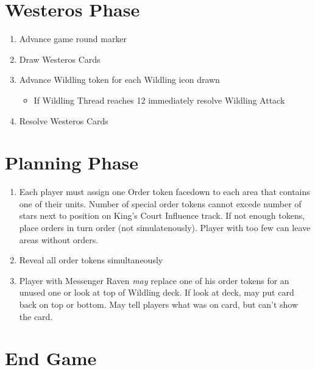 \documentclass[12pt]{article}
\newenvironment{enumerateCustom}
{\begin{enumerate}
  \setlength{\itemsep}{1pt}
  \setlength{\parskip}{0pt}
  \setlength{\parsep}{0pt}}
{\end{enumerate}}
\newenvironment{itemizeCustom}
{\begin{itemize}
  \setlength{\itemsep}{1pt}
  \setlength{\parskip}{0pt}
  \setlength{\parsep}{0pt}}
{\end{itemize}}
\begin{document}
\begin{mdframed}[style = customFrame]
\begin{multicols*}{2}
\section*{Westeros Phase}
\begin{enumerateCustom}
	\item Advance game round marker
	\item Draw Westeros Cards
	\item Advance Wildling token for each Wildling icon drawn 
	\begin{itemizeCustom}
		\item If Wildling Thread reaches 12 immediately resolve Wildling Attack
	\end{itemizeCustom}
	\item Resolve Westeros Cards
\end{enumerateCustom}

\section*{Planning Phase}
\begin{enumerateCustom}
	\item Each player must assign one Order token facedown to each area that contains one of their units. Number of special order tokens cannot excede number of stars next to position on King's Court Influence track. If not enough tokens, place orders in turn order (not simulatenously). Player with too few can leave areas without orders.
	\item Reveal all order tokens simultaneously
	\item Player with Messenger Raven \emph{may} replace one of his order tokens for an unused one or look at top of Wildling deck. If look at deck, may put card back on top or bottom. May tell players what was on card, but can't show the card.
\end{enumerateCustom}

\section*{End Game}

\end{multicols*}
\end{mdframed}
\end{document}
